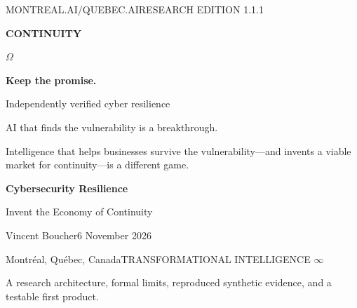 \documentclass[11pt,a4paper]{article}
\begin{document}
\hypersetup{pageanchor=false}
\begin{titlepage}
\thispagestyle{empty}
\color{white}
{\sffamily\small MONTREAL.AI\enspace /\enspace QUEBEC.AI\hfill RESEARCH EDITION 1.1.1}\par
\vspace{26mm}
{\sffamily\fontsize{39}{44}\selectfont\bfseries CONTINUITY}\par
\vspace{2mm}
{\fontsize{90}{94}\selectfont\color{gold}$\Omega$}\par
\vspace{7mm}
{\sffamily\fontsize{25}{30}\selectfont\bfseries Keep the promise.}\par
\vspace{5mm}
{\sffamily\Large Independently verified cyber resilience}\par
\vspace{13mm}
\begin{minipage}{.90\textwidth}
\large
AI that finds the vulnerability is a breakthrough.\par
\vspace{3mm}
Intelligence that helps businesses survive the vulnerability---and invents a viable market for continuity---is a different game.
\end{minipage}
\vfill
{\sffamily\large\bfseries Cybersecurity Resilience}\par
{\sffamily\large Invent the Economy of Continuity}\par
\vspace{7mm}
{\sffamily Vincent Boucher\hfill 6 November 2026}\par
{\sffamily\small Montr\'eal, Qu\'ebec, Canada\hfill TRANSFORMATIONAL INTELLIGENCE $\infty$}\par
\vspace{9mm}
{\sffamily\footnotesize A research architecture, formal limits, reproduced synthetic evidence, and a testable first product.}
\end{titlepage}
\hypersetup{pageanchor=true}
\setcounter{page}{1}
\end{document}
